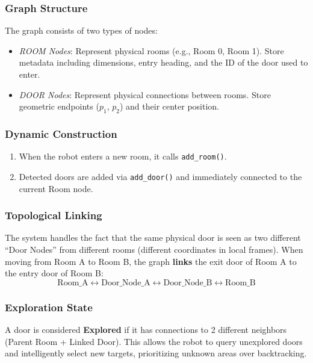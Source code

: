 \documentclass[conference]{IEEEtran}
\begin{document}
    \subsubsection{\textbf{Graph Structure}}
    The graph consists of two types of nodes:
    \begin{itemize}
        \item \textit{ROOM Nodes}: Represent physical rooms (e.g., Room 0, Room 1). Store metadata including dimensions, entry heading, and the ID of the door used to enter.
        \item \textit{DOOR Nodes}: Represent physical connections between rooms. Store geometric endpoints ($p_1$, $p_2$) and their center position.
    \end{itemize}

    \subsubsection{\textbf{Dynamic Construction}}
    \begin{enumerate}
        \item When the robot enters a new room, it calls \texttt{add\_room()}.
        \item Detected doors are added via \texttt{add\_door()} and immediately connected to the current Room node.
    \end{enumerate}

    \subsubsection{\textbf{Topological Linking}}
    The system handles the fact that the same physical door is seen as two different ``Door Nodes'' from different rooms (different coordinates in local frames). When moving from Room A to Room B, the graph \textbf{links} the exit door of Room A to the entry door of Room B:
    \begin{equation*}
        \text{Room\_A} \leftrightarrow \text{Door\_Node\_A} \leftrightarrow \text{Door\_Node\_B} \leftrightarrow \text{Room\_B}
    \end{equation*}

    \subsubsection{\textbf{Exploration State}}
    A door is considered \textbf{Explored} if it has connections to 2 different neighbors (Parent Room + Linked Door). This allows the robot to query unexplored doors and intelligently select new targets, prioritizing unknown areas over backtracking.
\end{document}
